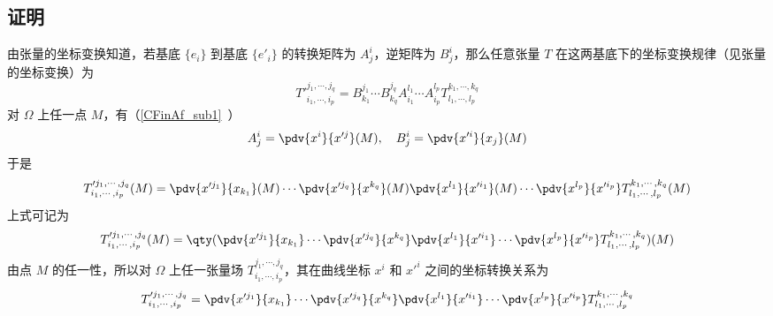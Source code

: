 \subsection{证明}
由张量的坐标变换知道，若基底 $\{e_i\}$ 到基底 $\{e'_i\}$ 的转换矩阵为 $A^i_j$，逆矩阵为 $B^i_j$，那么任意张量 $T$ 在这两基底下的坐标变换规律（见张量的坐标变换）为
\begin{equation}
T'^{j_1,\cdots,j_q}_{i_1,\cdots,i_p}=B^{j_1}_{k_1}\cdots B^{j_q}_{k_q}A^{l_1}_{i_1}\cdots A^{l_p}_{i_p}T^{k_1,\cdots,k_q}_{l_1,\cdots,l_p}
\end{equation}
对 $\Omega$ 上任一点 $M$，有（\autoref{CFinAf_sub1}~）
\begin{equation}
A^i_j=\pdv{x^i}{x'^j}(M),\quad B^i_j=\pdv{x'^i}{x_j}(M)
\end{equation}
于是
\begin{equation}
T'^{j_1,\cdots,j_q}_{i_1,\cdots,i_p}(M)=\pdv{x'^{j_1}}{x_{k_1}}(M)\cdots \pdv{x'^{j_q}}{x^{k_q}}(M)\pdv{x^{l_1}}{x'^{i_1}}(M)\cdots \pdv{x^{l_p}}{x'^{i_p}}T^{k_1,\cdots,k_q}_{l_1,\cdots,l_p}(M)
\end{equation}
上式可记为
\begin{equation}
T'^{j_1,\cdots,j_q}_{i_1,\cdots,i_p}(M)=\qty(\pdv{x'^{j_1}}{x_{k_1}}\cdots \pdv{x'^{j_q}}{x^{k_q}}\pdv{x^{l_1}}{x'^{i_1}}\cdots \pdv{x^{l_p}}{x'^{i_p}}T^{k_1,\cdots,k_q}_{l_1,\cdots,l_p})(M)
\end{equation}
由点 $M$ 的任一性，所以对 $\Omega$ 上任一张量场 $T^{j_1,\cdots,j_q}_{i_1,\cdots,i_p}$，其在曲线坐标 $x^i$ 和 $x'^i$ 之间的坐标转换关系为
\begin{equation}
T'^{j_1,\cdots,j_q}_{i_1,\cdots,i_p}=\pdv{x'^{j_1}}{x_{k_1}}\cdots \pdv{x'^{j_q}}{x^{k_q}}\pdv{x^{l_1}}{x'^{i_1}}\cdots \pdv{x^{l_p}}{x'^{i_p}}T^{k_1,\cdots,k_q}_{l_1,\cdots,l_p}
\end{equation}



